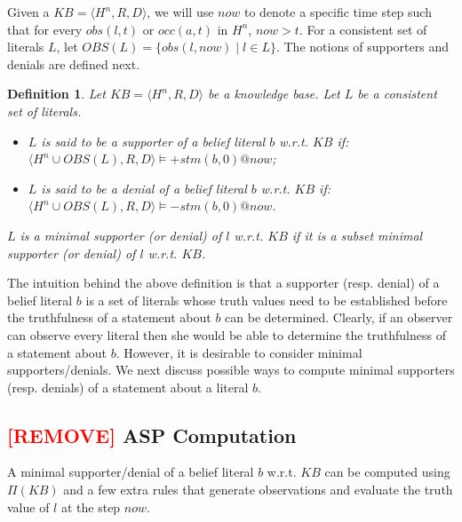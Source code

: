 \documentclass{article}
\newtheorem{definition}{Definition}
\begin{document}
Given a $KB = \langle H^{n}, R,D \rangle$, we will use $now$ to denote a specific time step 
such that for every $obs(l, t)$ or $occ(a,t)$ in $H^{n}$, $now > t$. 
For a consistent set of literals $L$, let 
$OBS(L) = \{obs(l, now) \mid l \in L\}.$ 
The notions of supporters and denials are defined next. 

\begin{definition} 
Let $KB  = \langle H^{n}, R,D \rangle$ be a knowledge base.  Let $L$ be a consistent set of literals. 
  \begin{itemize}
\item  $L$ is said to be a \emph{supporter} of a belief literal $b$ w.r.t. $KB$  
if:  $\langle H^{n}  \cup OBS(L) , R,D \rangle \models {+}stm(b,0)@now$;  

\item $L$ is said to be a \emph{denial} of a belief literal $b$ w.r.t. $KB$ 
if: $\langle H^{n}  \cup OBS(L) , R,D \rangle\models {-}stm(b,0)@now$. 
\end{itemize}  
%
$L$ is a \emph{minimal supporter (or denial)} of $l$  w.r.t. $KB$ if it is a subset minimal 
supporter (or denial) of $l$ w.r.t. $KB$.
\end{definition} 
%
The intuition behind the above definition is that a supporter (resp. denial) of a belief literal $b$ is a set of literals 
whose truth values need to be established before the truthfulness of a statement about $b$ can be determined. %
Clearly, if an observer can observe every literal %
then she would be able to determine the truthfulness of a statement about $b$. However, it is desirable to consider minimal supporters/denials. We next discuss possible ways to compute minimal supporters (resp. denials) of a statement about a literal $b$. 

\subsection{\textcolor{red}{[REMOVE]} ASP Computation}
 

A minimal supporter/denial of a belief literal $b$ w.r.t. $KB$ can be computed using $\Pi(KB)$ and a few extra rules that generate observations and evaluate the truth value of $l$ at the step $now$.
\end{document}
